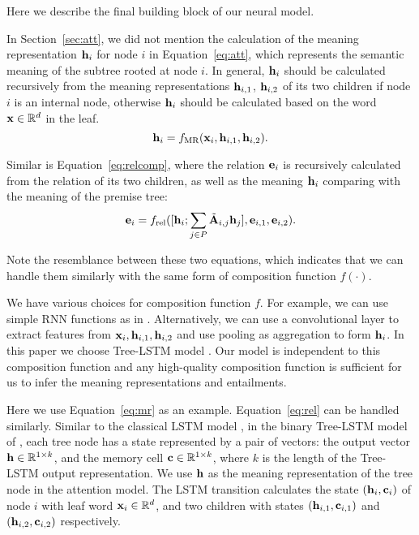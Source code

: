 

Here we describe the final building block of our neural model.

In Section~\ref{sec:att}, we did not mention the calculation of the
meaning representation $\mathbf{h}_i$ for node $i$ in Equation~\ref{eq:att},
which represents the semantic meaning of the subtree rooted at node $i$.
In general, $\mathbf{h}_i$ should be calculated recursively from the meaning
representations $\mathbf{h}_{i,1}$, $\mathbf{h}_{i,2}$ of its two children 
if node $i$ is an internal node, otherwise $\mathbf{h}_i$ should be calculated
based on the word $\mathbf{x}\in\mathbb{R}^d$ in the leaf. 
\begin{equation}
\mathbf{h}_i = f_{\text{MR}}(\mathbf{x}_i, \mathbf{h}_{i,1}, \mathbf{h}_{i, 2}).
\label{eq:mr}
\end{equation}

Similar is Equation~\ref{eq:relcomp}, where the relation $\mathbf{e}_i$
is recursively calculated from the relation of its two children, 
as well as the meaning $\mathbf{h}_i$
comparing with the meaning of the premise tree:
\begin{equation}
\mathbf{e}_i
= f_{\text{rel}}([\mathbf{h}_i; \sum_{j\in P}\tilde{\mathbf{A}}_{i,j} \mathbf{h}_j], \mathbf{e}_{i, 1}, \mathbf{e}_{i, 2}).
\label{eq:rel}
\end{equation}

Note the resemblance between these two equations, which indicates that
we can handle them similarly with the same form of composition function
$f(\cdot)$.

We have various choices for composition function $f$. For example,
we can use simple RNN functions as in .
Alternatively, we can use a convolutional layer to extract features
from $\mathbf{x}_i, \mathbf{h}_{i, 1}, \mathbf{h}_{i, 2}$ and use pooling as aggregation 
to form $\mathbf{h}_i$. 
In this paper we choose Tree-LSTM model \cite{tai2015improved}.
Our model is independent to this composition function
and any high-quality composition function is sufficient 
for us to infer the meaning representations and entailments.

Here we use Equation~\ref{eq:mr} as an example. Equation~\ref{eq:rel}
can be handled similarly.
Similar to the classical LSTM model \cite{hochreiter1997long}, 
in the binary Tree-LSTM model of , 
each tree node has a state represented by a pair of vectors:
the output vector $\mathbf{h}\in\mathbb{R}^{1\times k}$, 
and the memory cell $\mathbf{c}\in\mathbb{R}^{1\times k}$,
where $k$ is the length of the Tree-LSTM
output representation. We use $\mathbf{h}$ as the meaning representation
of the tree node in the attention model.
The LSTM transition calculates
 the state $(\mathbf{h}_i, \mathbf{c}_i)$ of node $i$ 
with leaf word $\mathbf{x}_i\in \mathbb{R}^d$,
and two children with states $(\mathbf{h}_{i, 1}, \mathbf{c}_{i,1})$
and $(\mathbf{h}_{i,2}, \mathbf{c}_{i,2})$ respectively.

